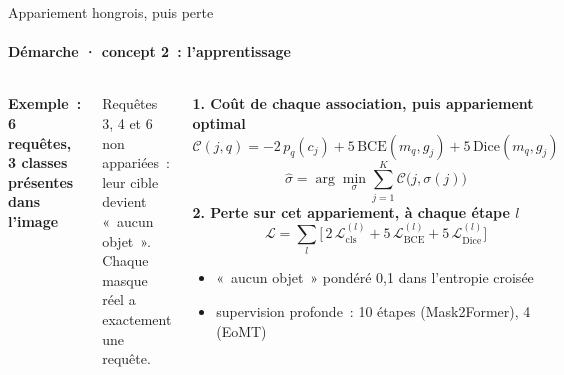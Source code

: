 \documentclass[aspectratio=169,9pt,xcolor=table,t]{beamer}
\newcommand{\cvsource}{}
\newcommand{\setsource}[1]{\gdef\cvsource{\ \textperiodcentered\ #1}}
\newcommand{\soft}[1]{{\color{bodyc}#1}}
\begin{document}
\begin{frame}{Appariement hongrois, puis perte}
\framesubtitle{Démarche · concept 2~: l'apprentissage}
\setsource{Cheng et al., 2022~; Kuhn, 1955}
\vspace{1mm}
\begin{columns}[T,onlytextwidth]
{\small\bfseries Exemple~: 6 requêtes, 3 classes présentes dans l'image}\par\vspace{2mm}
\par\vspace{2mm}
\soft{\small Requêtes 3, 4 et 6 non appariées~: leur cible devient «~aucun objet~». Chaque masque réel a exactement une requête.}
\begin{card}[fontupper=\small,before upper={\RaggedRight\abovedisplayskip=3pt\belowdisplayskip=3pt\abovedisplayshortskip=2pt\belowdisplayshortskip=2pt}]
{\bfseries\color{accent}1. Coût de chaque association, puis appariement optimal}
\[\mathcal{C}(j,q) = -2\,p_q(c_j) + 5\,\mathrm{BCE}(m_q, g_j) + 5\,\mathrm{Dice}(m_q, g_j)\]
\[\hat\sigma = \arg\min_{\sigma} \sum_{j=1}^{K} \mathcal{C}\big(j, \sigma(j)\big)\]
{\bfseries\color{accent}2. Perte sur cet appariement, à chaque étape $l$}
\[\mathcal{L} = \sum_{l} \Big[\,2\,\mathcal{L}^{(l)}_{\mathrm{cls}} + 5\,\mathcal{L}^{(l)}_{\mathrm{BCE}} + 5\,\mathcal{L}^{(l)}_{\mathrm{Dice}}\Big]\]
\begin{itemize}\color{bodyc}
\item «~aucun objet~» pondéré 0,1 dans l'entropie croisée
\item supervision profonde~: 10 étapes (Mask2Former), 4 (EoMT)
\end{itemize}

\end{card}
\end{columns}
\end{frame}
\end{document}
